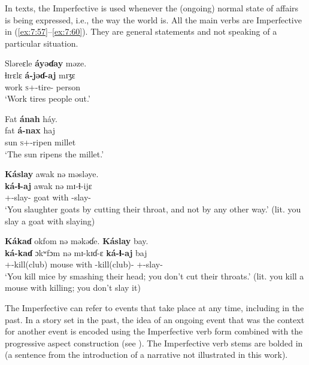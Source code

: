 In texts, the Imperfective is used whenever the (ongoing) normal state of affairs is being expressed, i.e., the way the world is. All the main verbs are Imperfective in (\ref{ex:7:57}--\ref{ex:7:60}). They are general statements and not speaking of a particular situation. 

\ea\label{ex:7:57}
Sləreɛle  \textbf{áyəɗay} məze.\\
\gll  ɬɪrɛlɛ   \textbf{á-jəɗ{}-aj}      mɪʒɛ\\
      work  \textsc{s}+{\IFV}-tire{}-{\CL}  person\\
\glt  ‘Work tires people out.’\\
\z  

\ea\label{ex:7:58}
Fat  \textbf{ánah}  háy.\\
\gll  fat    \textbf{á-nax}    haj\\
      sun     \textsc{s}+{\IFV}-ripen  millet\\
\glt  ‘The sun ripens the millet.’ 
\z  

\ea\label{ex:7:59}
\textbf{Káslay} awak  nə  məsləye.\\
\gll  \textbf{ká-ɬ{}-aj}  awak  nə  mɪ-ɬ{}-ijɛ\\
      {\twoS}+{\IFV}-slay{}-{\CL}  goat  with  {\NOM}{}-slay-{\CL}\\
\glt  ‘You slaughter goats by cutting their throat, and not by any other way.’ (lit. you slay a goat with slaying)\\
\z 

\ea\label{ex:7:60}
\textbf{Kákaɗ}  okfom  nə  məkəɗe.  \textbf{Káslay} bay.\\
\gll  \textbf{ká-kaɗ}  ɔkʷfɔm  nə  mɪ-kɪɗ-ɛ      \textbf{ká-ɬ{}-aj}    baj\\
      {\twoS}+{\IFV}-kill(club)  mouse  with  {\NOM}{}-kill(club)-{\CL}  {\twoS}+{\IFV}-slay-{\CL}  {\NEG}\\
\glt  ‘You kill mice by smashing their head; you don’t cut their throats.’ (lit. you kill a mouse with killing; you don’t slay it)\\
\z  

The Imperfective can refer to events that take place at any time, including in the past.  In a story set in the past, the idea of an ongoing event that was the context for another event is encoded using the Imperfective verb form combined with the progressive aspect construction (see ). The Imperfective verb stems are bolded in  (a sentence from the introduction of a narrative not illustrated in this work). 

